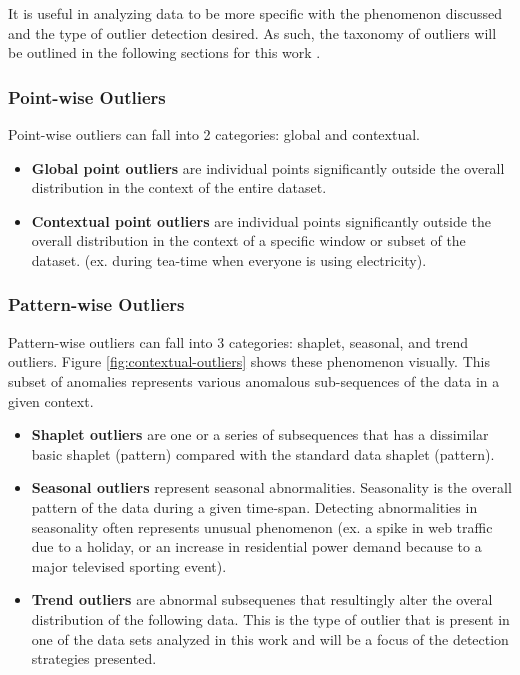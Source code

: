 It is useful in analyzing data to be more specific with the phenomenon discussed and the type of outlier detection desired. As such, the taxonomy of outliers will be outlined in the following sections for this work \parencite{lai2021revisiting}.

\subsubsection{Point-wise Outliers}
Point-wise outliers can fall into 2 categories: global and contextual.
\begin{itemize}
    \item \textbf{Global point outliers} are individual points significantly outside the overall distribution in the context of the entire dataset.
    \item \textbf{Contextual point outliers} are individual points significantly outside the overall distribution in the context of a specific window or subset of the dataset. (ex. during tea-time when everyone is using electricity).
\end{itemize} 
\subsubsection{Pattern-wise Outliers}
Pattern-wise outliers can fall into 3 categories: shaplet, seasonal, and trend outliers. Figure \ref{fig:contextual-outliers} shows these phenomenon visually. This subset of anomalies represents various anomalous sub-sequences of the data in a given context. 
\begin{itemize}
    \item \textbf{Shaplet outliers} are one or a series of subsequences that has a dissimilar basic shaplet (pattern) compared with the standard data shaplet (pattern).
    \item \textbf{Seasonal outliers} represent seasonal abnormalities. Seasonality is the overall pattern of the data during a given time-span. Detecting abnormalities in seasonality often represents unusual phenomenon (ex. a spike in web traffic due to a holiday, or an increase in residential power demand because to a major televised sporting event). 
    \item \textbf{Trend outliers} are abnormal subsequenes that resultingly alter the overal distribution of the following data. This is the type of outlier that is present in one of the data sets analyzed in this work and will be a focus of the detection strategies presented. 
\end{itemize} 

